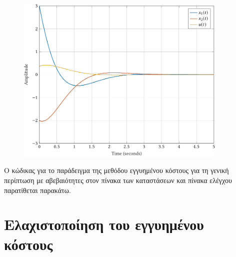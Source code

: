 \begin{figure}[h]
    \centering
    \includegraphics[width=0.9\textwidth]{figures/gcc_quad_bound_gen3.pdf}
    \label{fig:gcc_quad_bound_gen3}
\end{figure}

Ο κώδικας για το παράδειγμα της μεθόδου εγγυημένου κόστους για τη γενική
περίπτωση με αβεβαιότητες στον πίνακα των καταστάσεων και πίνακα ελέγχου
παρατίθεται παρακάτω.
\eng{}

\section{Ελαχιστοποίηση του εγγυημένου κόστους}
